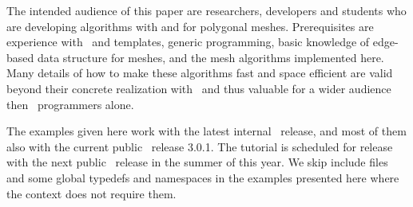 \noindent
The intended audience of this paper are researchers, developers and
students
who are
developing algorithms with and for polygonal meshes. Prerequisites are
experience with \CC\ and templates, generic programming, basic
knowledge of edge-based data structure for meshes, and the mesh
algorithms implemented here. 
Many details of how to make these algorithms fast and
space efficient are valid beyond their concrete realization with
\cgal\ and thus valuable for a wider audience then \cgal\ programmers
alone.

The examples given here work with the latest internal \cgal\ release,
and most of them also with the current public \cgal\ release
3.0.1. The tutorial is scheduled for release with the next public
\cgal\ release in the summer of this year. We skip include files and some
global typedefs and namespaces in the examples presented here where
the context does not require them.





